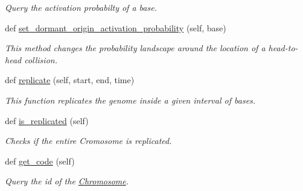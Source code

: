 \begin{DoxyCompactItemize}
\begin{DoxyCompactList}\small\item\em Query the activation probabilty of a base. \end{DoxyCompactList}\item 
def \mbox{\hyperlink{classReDyMo_1_1src_1_1chromosome_1_1Chromosome_a693010ebf7c4b74df6b1a70f39ab245d}{set\+\_\+dormant\+\_\+origin\+\_\+activation\+\_\+probability}} (self, base)
\begin{DoxyCompactList}\small\item\em This method changes the probability landscape around the location of a head-\/to-\/head collision. \end{DoxyCompactList}\item 
def \mbox{\hyperlink{classReDyMo_1_1src_1_1chromosome_1_1Chromosome_aac8462677b62589ca8f103c047c5c014}{replicate}} (self, start, end, time)
\begin{DoxyCompactList}\small\item\em This function replicates the genome inside a given interval of bases. \end{DoxyCompactList}\item 
def \mbox{\hyperlink{classReDyMo_1_1src_1_1chromosome_1_1Chromosome_af22490836eb322b1dc55eaf10d14c7bb}{is\+\_\+replicated}} (self)
\begin{DoxyCompactList}\small\item\em Checks if the entire Cromosome is replicated. \end{DoxyCompactList}\item 
def \mbox{\hyperlink{classReDyMo_1_1src_1_1chromosome_1_1Chromosome_a8fc8b953b0ba394a0dfc80fcdbcd274e}{get\+\_\+code}} (self)
\begin{DoxyCompactList}\small\item\em Query the id of the \mbox{\hyperlink{classReDyMo_1_1src_1_1chromosome_1_1Chromosome}{Chromosome}}. \end{DoxyCompactList}\end{DoxyCompactItemize}
